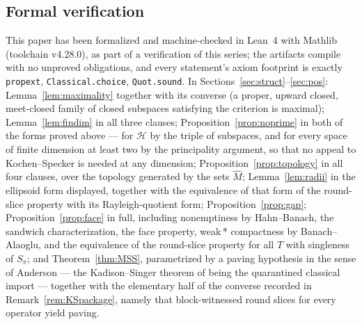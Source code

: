 \documentclass[11pt,reqno]{amsart}
\theoremstyle{definition}
\newcommand{\HH}{\mathcal{H}}
\newcommand{\pluf}{\pi}
\begin{document}
\subsection*{Formal verification}
This paper has been formalized and machine-checked in Lean~4 with Mathlib
(toolchain v4.28.0), as part of a verification of this series; the artifacts compile
with no unproved obligations, and every statement's axiom footprint is exactly
\texttt{propext}, \texttt{Classical.choice}, \texttt{Quot.sound}. In
Sections~\ref{sec:struct}--\ref{sec:pos}:
Lemma~\ref{lem:maximality} together with its converse (a proper, upward closed,
meet-closed family of closed subspaces satisfying the criterion is maximal);
Lemma~\ref{lem:findim} in all three clauses; Proposition~\ref{prop:noprime} in both of the
forms proved above --- for $\HH$ by the triple of subspaces, and for every space of
finite dimension at least two by the principality argument, so that no appeal to
Kochen--Specker is needed at any dimension;
Proposition~\ref{prop:topology} in all four clauses, over the topology generated by the
sets $\widehat M$; Lemma~\ref{lem:radii} in the ellipsoid form displayed, together with
the equivalence of that form of the round-slice property with its Rayleigh-quotient
form; Proposition~\ref{prop:gap}; Proposition~\ref{prop:face} in full, including
nonemptiness by Hahn--Banach, the sandwich characterization, the face property, weak\,*
compactness by Banach--Alaoglu, and the equivalence of the round-slice property for all
$T$ with singleness of $S_\pluf$; and Theorem~\ref{thm:MSS}, parametrized by a paving
hypothesis in the sense of Anderson --- the Kadison--Singer theorem of
\cite{MSS} being the quarantined classical import --- together with the elementary half
of the converse recorded in Remark~\ref{rem:KSpackage}, namely that block-witnessed
round slices for every operator yield paving.
\end{document}
